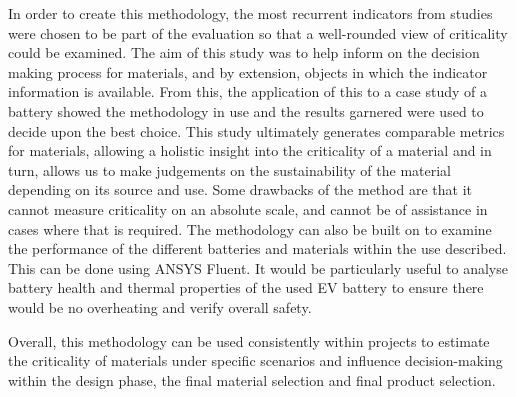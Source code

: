 \documentclass{article}
\begin{document}
In order to create this methodology, the most recurrent indicators from studies were chosen to be part of the evaluation so that a well-rounded view of criticality could be examined. The aim of this study was to help inform on the decision making process for materials, and by extension, objects in which the indicator information is available. From this, the application of this to a case study of a battery showed the methodology in use and the results garnered were used to decide upon the best choice. This study ultimately generates comparable metrics for materials, allowing a holistic insight into the criticality of a material and in turn, allows us to make judgements on the sustainability of the material depending on its source and use. Some drawbacks of the method are that it cannot measure criticality on an absolute scale, and cannot be of assistance in cases where that is required. The methodology can also be built on to examine the performance of the different batteries and materials within the use described. This can be done using ANSYS Fluent. It would be particularly useful to analyse battery health and thermal properties of the used EV battery to ensure there would be no overheating and verify overall safety. 

Overall, this methodology can be used consistently within projects to estimate the criticality of materials under specific scenarios and influence decision-making within the design phase, the final material selection and final product selection.
\end{document}
